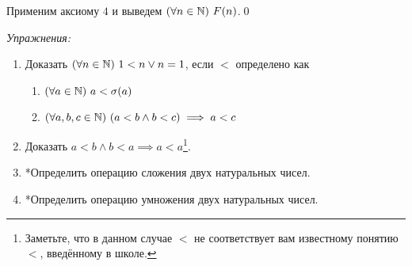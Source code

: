 Применим аксиому $4$ и выведем $(\forall n\in\mathbb{N})~F(n)$.\qed

{\it Упражнения:}
\begin{enumerate}
	\item{}Доказать $(\forall n\in\mathbb{N})~1<n\lor n=1$, если $<$ определено как
	\begin{enumerate}
		\item{}$(\forall a\in\mathbb{N})~a<\sigma(a)$
		\item{}$(\forall a,b,c\in\mathbb{N})~(a<b\land b<c)\implies a<c$
	\end{enumerate}
	\item{}Доказать $a<b\land b<a\implies a<a$\footnote{
		Заметьте, что в данном случае $<$ не соответствует вам известному понятию $<$,
		введённому в школе.
	}.
	\item{}*Определить операцию сложения двух натуральных чисел.
	\item{}*Определить операцию умножения двух натуральных чисел.
\end{enumerate}

